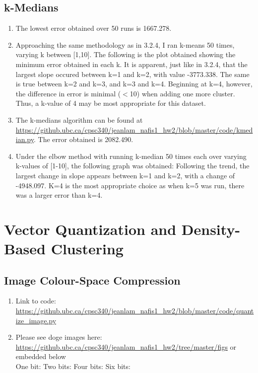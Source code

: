 \documentclass{article}
\begin{document}
\subsection{k-Medians}
\begin{enumerate}
\item {} The lowest error obtained over 50 runs is 1667.278.
\item Approaching the same methodology as in 3.2.4, I ran k-means 50 times, varying k between [1,10]. The following is the plot obtained showing the minimum error obtained in each k.  It is apparent, just like in 3.2.4, that the largest slope occured between k=1 and k=2, with value -3773.338. The same is true between k=2 and k=3, and k=3 and k=4. Beginning at k=4, however, the difference in error is minimal (${<}$10) when adding one more cluster. Thus, a k-value of 4 may be most appropriate for this dataset.
\item The k-medians algorithm can be found at \url{https://github.ubc.ca/cpsc340/jeanlam_nafis1_hw2/blob/master/code/kmedian.py}. The error obtained is 2082.490.
\item Under the elbow method with running k-median 50 times each over varying k-values of [1-10], the following graph was obtained:  Following the trend, the largest change in slope appears between k=1 and k=2, with a change of -4948.097. K=4 is the most appropriate choice as when k=5 was run, there was a larger error than k=4. 
\end{enumerate}

\section{Vector Quantization and Density-Based Clustering}
\subsection{Image Colour-Space Compression}
\begin{enumerate}
\item Link to code: \url{https://github.ubc.ca/cpsc340/jeanlam_nafis1_hw2/blob/master/code/quantize_image.py}
\item Please see doge images here: \url{https://github.ubc.ca/cpsc340/jeanlam_nafis1_hw2/tree/master/figs} or embedded below\\
One bit:
 Two bits:
 Four bits:
 Six bits:

\end{enumerate}
\end{document}
